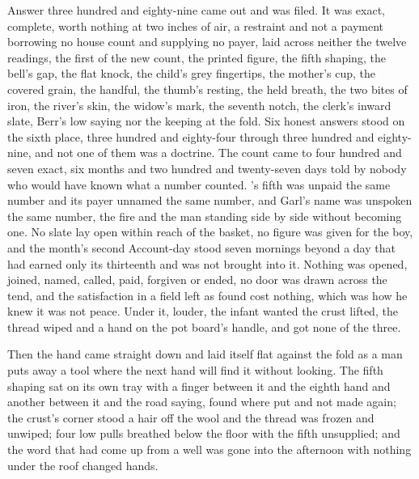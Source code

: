 Answer three hundred and eighty-nine came out and was filed. It was exact, complete, worth nothing at two inches of air, a restraint and not a payment borrowing no house count and supplying no payer, laid across neither the twelve readings, the first of the new count, the printed figure, the fifth shaping, the bell's gap, the flat knock, the child's grey fingertips, the mother's cup, the covered grain, the handful, the thumb's resting, the held breath, the two bites of iron, the river's skin, the widow's mark, the seventh notch, the clerk's inward slate, Berr's low saying nor the keeping at the fold. Six honest answers stood on the sixth place, three hundred and eighty-four through three hundred and eighty-nine, and not one of them was a doctrine. The count came to four hundred and seven exact, six months and two hundred and twenty-seven days told by nobody who would have known what a number counted. 's fifth was unpaid the same number and its payer unnamed the same number, and Garl's name was unspoken the same number, the fire and the man standing side by side without becoming one. No slate lay open within reach of the basket, no figure was given for the boy, and the month's second Account-day stood seven mornings beyond a day that had earned only its thirteenth and was not brought into it. Nothing was opened, joined, named, called, paid, forgiven or ended, no door was drawn across the tend, and the satisfaction in a field left as found cost nothing, which was how he knew it was not peace. Under it, louder, the infant wanted the crust lifted, the thread wiped and a hand on the pot board's handle, and got none of the three.

Then the hand came straight down and laid itself flat against the fold as a man puts away a tool where the next hand will find it without looking. The fifth shaping sat on its own tray with a finger between it and the eighth hand and another between it and the road saying, found where put and not made again; the crust's corner stood a hair off the wool and the thread was frozen and unwiped; four low pulls breathed below the floor with the fifth unsupplied; and the word that had come up from a well was gone into the afternoon with nothing under the roof changed hands.
